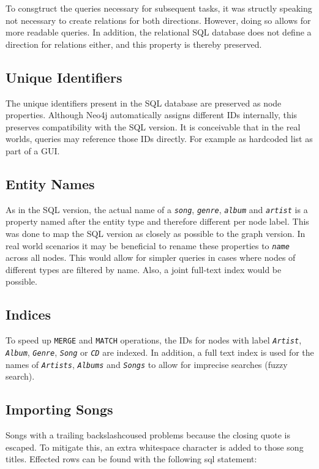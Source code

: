\documentclass{article}
\newcommand{\name}[1]{\texttt{\emph{#1}}}
\begin{document}
To consgtruct the queries necessary for subsequent tasks, it was structly speaking not necessary to create relations for both directions. However, doing so allows for more readable queries. In addition, the relational SQL database does not define a direction for relations either, and this property is thereby preserved.

\subsection{Unique Identifiers}
The unique identifiers present in the SQL database are preserved as node properties. Although Neo4j automatically assigns different IDs internally, this preserves compatibility with the SQL version. It is conceivable that in the real worlds, queries may reference those IDs directly. For example as hardcoded list as part of a GUI.

\subsection{Entity Names}
As in the SQL version, the actual name of a \name{song}, \name{genre}, \name{album} and \name{artist} is a property named after the entity type and therefore different per node label. This was done to map the SQL version as closely as possible to the graph version. In real world scenarios it may be beneficial to rename these properties to \name{name} across all nodes. This would allow for simpler queries in cases where nodes of different types are filtered by name. Also, a joint full-text index would be possible.

\subsection{Indices}
To speed up \texttt{MERGE} and \texttt{MATCH} operations, the IDs for nodes with label \name{Artist}, \name{Album}, \name{Genre}, \name{Song} or \name{CD} are indexed. In addition, a full text index is used for the names of \name{Artists}, \name{Albums} and \name{Songs} to allow for imprecise searches (fuzzy search).

\subsection{Importing Songs}

Songs with a trailing backslashcoused problems because the closing quote is escaped. To mitigate this, an extra whitespace character is added to those song titles. Effected rows can be found with the following sql statement:
\end{document}
